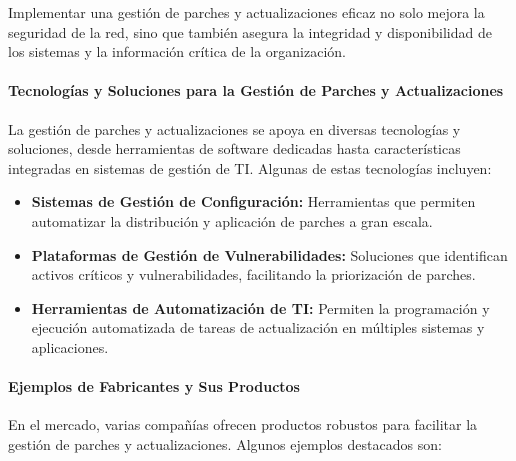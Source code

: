 Implementar una gestión de parches y actualizaciones eficaz no solo mejora la seguridad de la red, sino que también asegura la integridad y disponibilidad de los sistemas y la información crítica de la organización.


\paragraph{Tecnologías y Soluciones para la Gestión de Parches y Actualizaciones}

La gestión de parches y actualizaciones se apoya en diversas tecnologías y soluciones, desde herramientas de software dedicadas hasta características integradas en sistemas de gestión de TI. Algunas de estas tecnologías incluyen:

\begin{itemize}
    \item \textbf{Sistemas de Gestión de Configuración:} Herramientas que permiten automatizar la distribución y aplicación de parches a gran escala.
    \item \textbf{Plataformas de Gestión de Vulnerabilidades:} Soluciones que identifican activos críticos y vulnerabilidades, facilitando la priorización de parches.
    \item \textbf{Herramientas de Automatización de TI:} Permiten la programación y ejecución automatizada de tareas de actualización en múltiples sistemas y aplicaciones.
\end{itemize}

\paragraph{Ejemplos de Fabricantes y Sus Productos}

En el mercado, varias compañías ofrecen productos robustos para facilitar la gestión de parches y actualizaciones. Algunos ejemplos destacados son:


